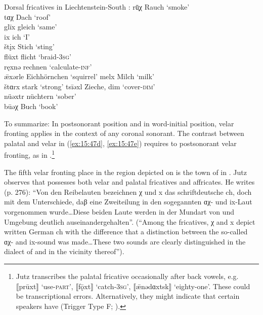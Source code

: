 \ea%
\label{ex:15:47}Dorsal fricatives in Liechtenstein-South :
\ea\label{ex:15:47a}  rū̜χ  \tab  [rʊːx] \tab Rauch \tab ‘smoke’ \\
     tɑχ  \tab  [dɑx] \tab Dach \tab ‘roof’ \\
\ex\label{ex:15:47b}  glīx  \tab  [gliːç] \tab gleich \tab ‘same’ \\
     ix  \tab  [iç] \tab ich \tab ‘I’ \\
     štįx  \tab  [ʃtɪç] \tab Stich \tab ‘sting’ \\
     flüxt \tab [flyçt] \tab flicht \tab ‘braid-\textsc{3}\textsc{sg}’ \\
     ręxnə \tab [rɛçnə] \tab rechnen \tab ‘calculate-\textsc{inf}’ \\
     ǣxərle \tab [æːçr̩li] \tab Eichhörnchen \tab ‘squirrel’ 
\ex\label{ex:15:47c}  melx \tab [melç] \tab Milch \tab ‘milk’  \\
     štɑrx \tab [ʃtɑrç] \tab stark \tab ‘strong’  
\ex\label{ex:15:47d}  tsīəxl \tab [tsiːəçli] \tab Zieche, dim \tab ‘cover-\textsc{dim}’ \\
     nüəxtr \tab [nyəçtr̩] \tab nüchtern \tab ‘sober’ \\
\ex\label{ex:15:47e}  būəχ \tab [buːəx] \tab Buch \tab ‘book’ 
\z 
\z 

To summarize: In postsonorant position and in word-initial position, velar fronting applies in the context of any coronal sonorant. The contrast between palatal and velar in (\ref{ex:15:47d}, \ref{ex:15:47e}) requires  to  postsonorant velar fronting, as in .\footnote{{Jutz transcribes the palatal fricative occasionally after back vowels, e.g. ⟦prūxt⟧ ‘use-}\textrm{\textsc{part}}\textrm{’, ⟦fǭxt⟧ ‘catch-}\textrm{\textsc{3}\textsc{sg}}\textrm{’,  ⟦ǣnədɑxtsk⟧ ‘eighty-one’. These could be transcriptional errors. Alternatively, they might indicate that certain speakers have  (Trigger Type F; ).}}

The fifth velar fronting place in the region depicted on  is the town of  in  \citep{Jutz1922}. Jutz observes that  possesses both velar and palatal fricatives and affricates. He writes (p. 276): “Von den Reibelauten bezeichnen χ und x das schriftdeutsche ch, doch mit dem Unterschiede, daβ eine Zweiteilung in den sogegannten ɑχ- und ix-Laut vorgenommen wurde…Diese beiden Laute werden in der Mundart von  und Umgebung deutlich auseinandergehalten”.  (“Among the fricatives, χ and x depict written German ch with the difference that a distinction between the so-called ɑχ- and ix-sound was made…These two sounds are clearly distinguished in the dialect of  and in the vicinity thereof”).


